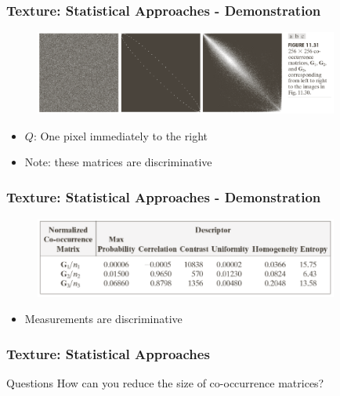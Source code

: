 \documentclass[english,11pt,table,handout]{beamer}
\begin{document}
\frame
{
	\frametitle{Texture: Statistical Approaches - Demonstration}
	\begin{figure}[!h]
		\includegraphics[width=10cm]{texture_5.png}
	\end{figure}
	\begin{itemize}
		\item $Q$: One pixel immediately to the right
		\item Note: these matrices are discriminative
	\end{itemize}
}
\frame
{
	\frametitle{Texture: Statistical Approaches - Demonstration}
	\begin{figure}[!h]
		\includegraphics[width=10cm]{texture_6.png}
	\end{figure}
	\begin{itemize}
		\item Measurements are discriminative
		
	\end{itemize}
}

\frame
{
	\frametitle{Texture: Statistical Approaches}
	\begin{block}{Questions}
		How can you reduce the size of co-occurrence matrices?
		
	\end{block}
}
\end{document}
